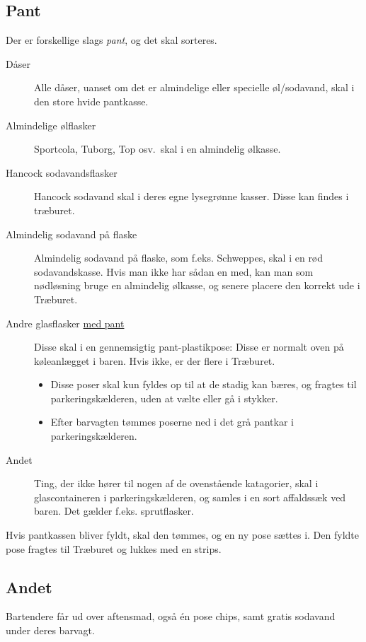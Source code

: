 \subsection{Pant}
\label{sec:intra:pant}

Der er forskellige slags \textit{pant}, og det skal sorteres.
\begin{description}
\item[Dåser] Alle dåser, uanset om det er almindelige eller specielle
  øl/sodavand, skal i den store hvide pantkasse.
\item[Almindelige ølflasker] Sportcola, Tuborg, Top osv.\ skal i en almindelig ølkasse.
\item[Hancock sodavandsflasker] Hancock sodavand skal i deres egne lysegrønne kasser. Disse kan findes i træburet.
\item[Almindelig sodavand på flaske] Almindelig sodavand på flaske, som f.eks. Schweppes, skal i en
  rød sodavandskasse. Hvis man ikke har sådan en med, kan man som
  nødløsning bruge en almindelig ølkasse, og senere placere den korrekt ude i Træburet.
\item[Andre glasflasker \underline{med pant}] Disse skal i en gennemsigtig
  pant-plastikpose: Disse er normalt oven på køleanlægget i baren. Hvis ikke, er der flere i Træburet.
  \begin{itemize}
    \item Disse poser skal kun fyldes op til at de stadig kan bæres, og fragtes til parkeringskælderen, 
    uden at vælte eller gå i stykker.
    \item Efter barvagten tømmes poserne ned i det grå pantkar i parkeringskælderen.
  \end{itemize}
\item[Andet] Ting, der ikke hører til nogen af de ovenstående
  katagorier, skal i glascontaineren i parkeringskælderen,
  og samles i en sort affaldssæk ved baren. Det gælder f.eks. sprutflasker.
\end{description}

Hvis pantkassen bliver fyldt, skal den tømmes, og en ny pose sættes i. 
Den fyldte pose fragtes til Træburet og lukkes med en strips.

\subsection{Andet}
\label{sec:intra:andet}

Bartendere får ud over aftensmad, også én pose chips, samt gratis
sodavand under deres barvagt.

